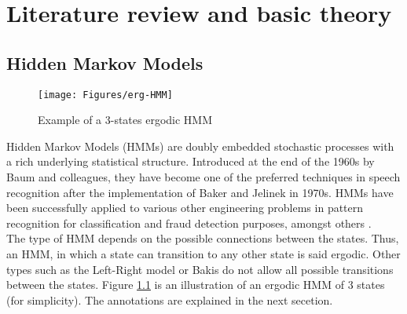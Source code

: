 \chapter{Literature review and basic theory}

\section{Hidden Markov Models}
\begin{figure}[ht!]
	\centering
	\texttt{[image: Figures/erg-HMM]}
	\caption{Example of a 3-states ergodic HMM}{\cite{thes2011}}
	\label{fig:erg}
\end{figure}
Hidden Markov Models (HMMs) are doubly embedded stochastic processes with a rich underlying statistical structure. Introduced at the end of the 1960s by Baum and colleagues, they have become one of the preferred techniques in speech recognition after the implementation of Baker and Jelinek in 1970s. HMMs have been successfully applied to various other engineering problems in pattern recognition for classification and fraud detection purposes, amongst others \cite{tuto1989} \cite{tool2001} \cite{towa2009} \cite{twop2008}.\\
The type of HMM depends on the possible connections between the states. Thus, an HMM, in which a state can transition to any other state is said ergodic. Other types such as the Left-Right model or Bakis do not allow all possible transitions between the states. Figure \ref{fig:erg} is an illustration of an ergodic HMM of 3 states (for simplicity). The annotations are explained in the next secetion. 

